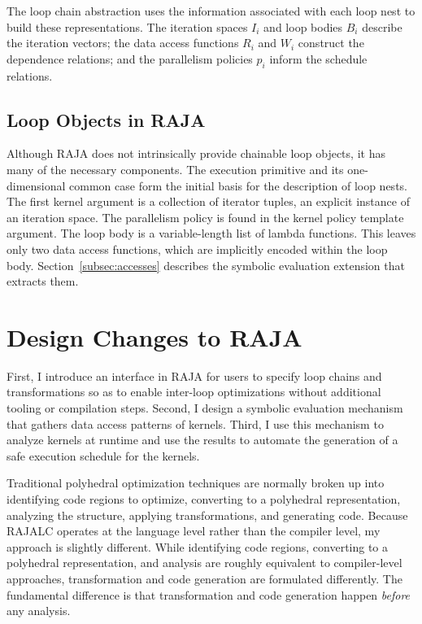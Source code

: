 The loop chain abstraction uses the information associated with each loop 
nest to build these representations.
The iteration spaces $I_{i}$ and loop bodies $B_{i}$ describe the iteration
vectors; the data access functions $R_{i}$ and $W_{i}$ construct the
dependence relations; and the parallelism policies $p_{i}$ inform the
schedule relations.


\subsection{Loop Objects in RAJA}

Although RAJA does not intrinsically provide chainable loop objects, it has many
of the necessary components.
The execution primitive  and its one-dimensional common case  form
the initial basis for the description of loop nests.
The first kernel argument is a collection of iterator tuples, an explicit
instance of an iteration space.
The parallelism policy is found in the kernel policy template argument.
The loop body is a variable-length list of lambda functions.
This leaves only two data access functions, which are implicitly encoded
within the loop body.
Section~\ref{subsec:accesses} describes the symbolic evaluation extension
that extracts them.

\section{Design Changes to RAJA}

First, I introduce an interface in RAJA for users to specify loop chains and transformations
so as to enable inter-loop optimizations without additional tooling or compilation steps.
Second, I design a symbolic evaluation mechanism that gathers data access patterns of
kernels.
Third, I use this mechanism to analyze kernels at runtime and use the results to automate the generation of a safe execution schedule for the kernels.


Traditional polyhedral optimization techniques are normally broken up into identifying code regions to optimize, converting to a polyhedral representation, analyzing the structure, applying transformations, and generating code.
Because RAJALC operates at the language level rather than the compiler level, my approach is slightly different. While identifying code regions, converting to a polyhedral representation, and analysis are roughly equivalent to compiler-level approaches, transformation and code generation are formulated differently. 
The fundamental difference is that transformation and code generation happen \textit{before} any analysis.


